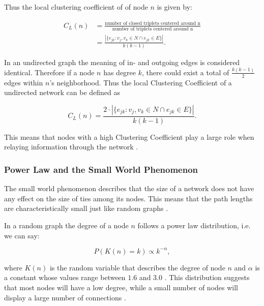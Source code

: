 Thus the local clustering coefficient of of node $n$ is given by:

\begin{align}
C_L(n) &= \frac{\text{number of closed triplets centered around n}}{\text{number of triplets centered around n}} \nonumber \\
       &= \frac{|\{ e_{jk}: v_j, v_k \in N \cap e_{jk} \in E \}|}{k(k-1)}. 
\end{align}

In an undirected graph the meaning of in- and outgoing edges is considered identical. 
Therefore if a node $n$ has degree $k$, there could exist a total of $\frac{k(k-1)}{2}$ edges within $n$'s neighborhood.
Thus the local Clustering Coefficient of a undirected network can be defined as

\begin{equation}
C_L(n) = \frac{2\cdot |\{ e_{jk}: v_j, v_k \in N \cap e_{jk} \in E \}|}{k(k-1)}.
\end{equation}

This means that nodes with a high Clustering Coefficient play a large role when relaying information through the network \cite{graphbs}.

\subsubsection{Power Law and the Small World Phenomenon}

The small world phenomenon describes that the size of a network does not have any effect on the size of ties among its nodes. 
This means that the path lengths are characteristically small just like random graphs \cite{graphcluster}.

In a random graph the degree of a node $n$ follows a power law distribution, i.e. we can say:

\begin{equation}
P\left(K(n)=k\right) \propto k^{-\alpha},
\end{equation}

where $K(n)$ is the random variable that describes the degree of node $n$ and $\alpha$ is a constant whose values range between $1.6$ and $3.0$ \cite{Newman2003}. 
This distribution suggests that most nodes will have a low degree, while a small number of nodes will display a large number of connections \cite{powerlaw}.